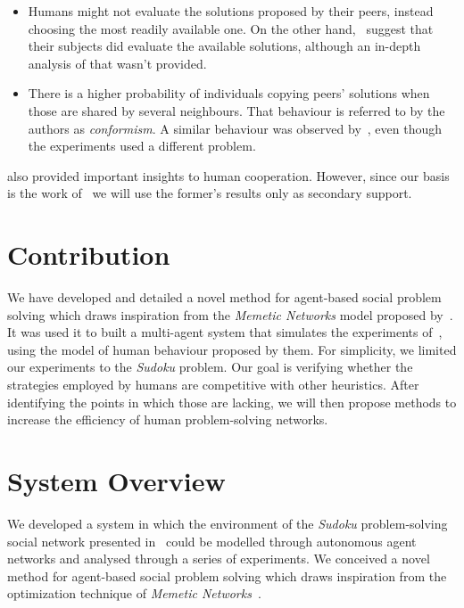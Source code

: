 \documentclass[letterpaper]{article}
\begin{document}
\begin{itemize}
	\item Humans might not evaluate the solutions proposed by their peers, instead choosing the most readily available one. On the other hand,~\cite{mason:collablearnet} suggest that their subjects did evaluate the available solutions, although an in-depth analysis of that wasn't provided.
	\item There is a higher probability of individuals copying peers' solutions when those are shared by several neighbours. That behaviour is referred to by the authors as \emph{conformism}. A similar behaviour was observed by~\cite{mason:collablearnet}, even though the experiments used a different problem.
\end{itemize}

\cite{mason:collablearnet} also provided important insights to human cooperation. However, since our basis is the work of~\cite{farenzena:collabem} we will use the former's results only as secondary support.

\section{Contribution}

We have developed and detailed a novel method for agent-based social problem solving which draws inspiration from the {\em Memetic Networks} model proposed by~\cite{araujo:memenet}. It was used it to built a multi-agent system that simulates the experiments of~\cite{farenzena:collabem}, using the model of human behaviour proposed by them. For simplicity, we limited our experiments to the {\em Sudoku} problem. Our goal is verifying whether the strategies employed by humans are competitive with other heuristics. After identifying the points in which those are lacking, we will then propose methods to increase the efficiency of human problem-solving networks.

\section{System Overview}

We developed a system in which the environment of the {\em Sudoku} problem-solving social network presented in~\cite{farenzena:collabem} could be modelled through autonomous agent networks and analysed through a series of experiments. We conceived a novel method for agent-based social problem solving which draws inspiration from the optimization technique of {\em Memetic Networks}~\cite{araujo:memenet}.
\end{document}
